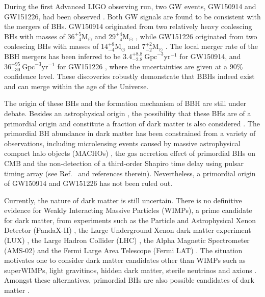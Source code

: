 During the first Advanced LIGO observing run, two \ac{GW} events, GW150914 and GW151226, had been observed \cite{Abbott:2016blz,Abbott:2016nmj}.
Both \ac{GW} signals are found to be consistent with the mergers of \acp{BH}.
GW150914 originated from two relatively heavy coalescing \acp{BH} with masses of $36^{+5}_{-4}\mathrm{M}_{\odot}$ and $29^{+4}_{-4}\mathrm{M}_{\odot}$ \cite{Abbott:2016blz}, while GW151226 originated from two coalescing \acp{BH} with masses of $14^{+8}_{-4}\mathrm{M}_{\odot}$ and $7^{+2}_{-2}\mathrm{M}_{\odot}$ \cite{Abbott:2016nmj}.
The local merger rate of the \ac{BBH} mergers has been inferred to be $3.4^{+8.8}_{-2.8} ~\textrm{Gpc}^{-3}\textrm{yr}^{-1}$ for GW150914, and $36^{+95}_{-30} ~\textrm{Gpc}^{-3}\textrm{yr}^{-1}$ for GW151226 \cite{TheLIGOScientific:2016pea},
where the uncertainties are given at a $90\%$ confidence level.
These discoveries robustly demonstrate that \acp{BBH} indeed exist and can merge within the age of the Universe.

The origin of these \acp{BH} and the formation mechanism of \ac{BBH} are still under debate.
Besides an astrophysical origin \cite{TheLIGOScientific:2016htt,Belczynski:2016obo,Belczynski:2010tb,Miller:2016krr}, the possibility that these \acp{BH} are of a primordial origin and constitute a fraction of dark matter is also considered \cite{Bird:2016dcv,Clesse:2016vqa,Sasaki:2016jop,Chen:2016pud,Kashlinsky:2016sdv,Bartolo:2016ami,Cholis:2016xvo}.
The primordial \ac{BH} abundance in dark matter has been constrained from a variety of observations, including microlensing events caused by massive astrophysical compact halo objects (MACHOs) \cite{Novati:2013fxa,Mediavilla:2009um,Green:2016xgy,Axelrod:2016nkp}, the gas accretion effect of primordial \acp{BH} on \ac{CMB} \cite{Ali-Haimoud:2016mbv} and the non-detection of a third-order Shapiro time delay using pulsar timing array \cite{Schutz:2016khr} (see Ref.~\cite{Carr:2016drx} and references therein). 
Nevertheless, a primordial origin of GW150914 and GW151226 has not been ruled out.

Currently, the nature of dark matter is still uncertain.
There is no definitive evidence for Weakly Interacting Massive Particles (WIMPs), a prime candidate for dark matter, from experiments such as the Particle and Astrophysical Xenon Detector (PandaX-II) \cite{Tan:2016zwf}, the Large Underground Xenon dark matter experiment (LUX) \cite{Akerib:2015rjg}, the Large Hadron Collider (LHC) \cite{ATLAS:2016hao}, the Alpha Magnetic Spectrometer (AMS-02) \cite{Accardo:2014lma} and the Fermi Large Area Telescope (Fermi LAT) \cite{FermiLAT:2011ab}.
The situation motivates one to consider dark matter candidates other than WIMPs such as superWIMPs, light gravitinos, hidden dark matter, sterile neutrinos and axions \cite{Feng:2010gw}.
Amongst these alternatives, primordial \acp{BH} are also possible candidates of dark matter \cite{Carr:2016drx}.

